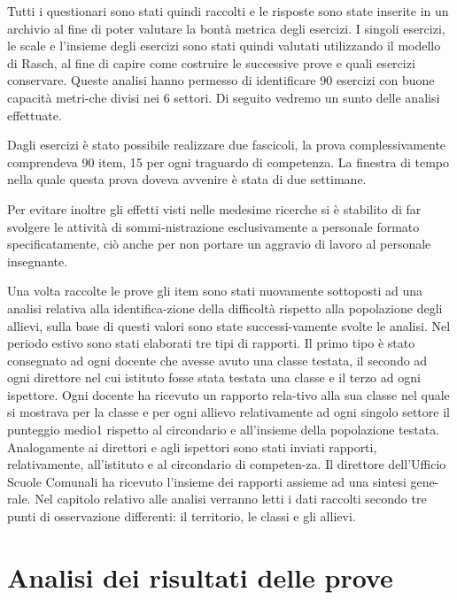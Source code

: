 \documentclass[
]{book}
\begin{document}
Tutti i questionari sono stati quindi raccolti e le risposte sono state inserite in un archivio al fine di poter valutare la bontà metrica degli esercizi. I singoli esercizi, le scale e l'insieme degli esercizi sono stati quindi valutati utilizzando il modello di Rasch, al fine di capire come costruire le successive prove e quali esercizi conservare. Queste analisi hanno permesso di identificare 90 esercizi con buone capacità metri-che divisi nei 6 settori. Di seguito vedremo un sunto delle analisi effettuate.

Dagli esercizi è stato possibile realizzare due fascicoli, la prova complessivamente comprendeva 90 item, 15 per ogni traguardo di competenza. La finestra di tempo nella quale questa prova doveva avvenire è stata di due settimane.

Per evitare inoltre gli effetti visti nelle medesime ricerche si è stabilito di far svolgere le attività di sommi-nistrazione esclusivamente a personale formato specificatamente, ciò anche per non portare un aggravio di lavoro al personale insegnante.

Una volta raccolte le prove gli item sono stati nuovamente sottoposti ad una analisi relativa alla identifica-zione della difficoltà rispetto alla popolazione degli allievi, sulla base di questi valori sono state successi-vamente svolte le analisi. Nel periodo estivo sono stati elaborati tre tipi di rapporti. Il primo tipo è stato consegnato ad ogni docente che avesse avuto una classe testata, il secondo ad ogni direttore nel cui istituto fosse stata testata una classe e il terzo ad ogni ispettore. Ogni docente ha ricevuto un rapporto rela-tivo alla sua classe nel quale si mostrava per la classe e per ogni allievo relativamente ad ogni singolo settore il punteggio medio1 rispetto al circondario e all'insieme della popolazione testata. Analogamente ai direttori e agli ispettori sono stati inviati rapporti, relativamente, all'istituto e al circondario di competen-za. Il direttore dell'Ufficio Scuole Comunali ha ricevuto l'insieme dei rapporti assieme ad una sintesi gene-rale.
Nel capitolo relativo alle analisi verranno letti i dati raccolti secondo tre punti di osservazione differenti: il territorio, le classi e gli allievi.

\hypertarget{analisi-dei-risultati-delle-prove}{%
\chapter{Analisi dei risultati delle prove}\label{analisi-dei-risultati-delle-prove}}
\end{document}

